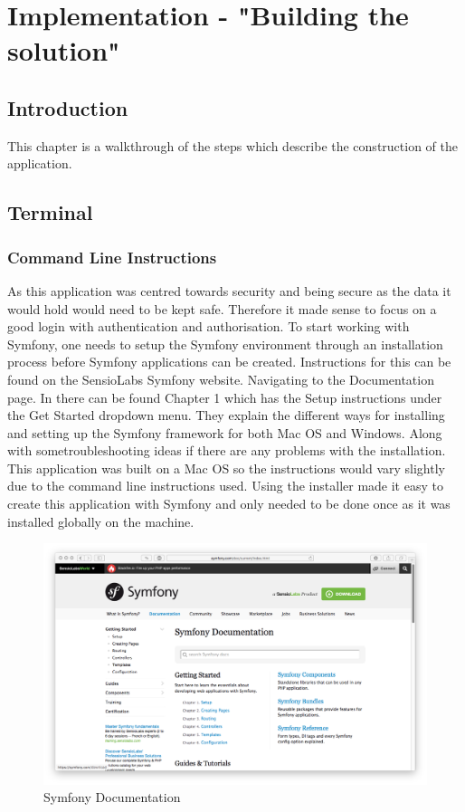 \chapter{Implementation - "Building the solution"}


\section{Introduction}

This chapter is a walkthrough of the steps which describe the construction of the application.

\section{Terminal}

\subsection{Command Line Instructions}

As this application was centred towards security and being secure as the data it would hold would need to be kept safe. Therefore it made sense to focus on a good login with authentication and authorisation. To start working with Symfony, one needs to setup the Symfony environment through an installation process before Symfony applications can be created. Instructions for this can be found on the SensioLabs Symfony website. Navigating to the Documentation page. In there can be found Chapter 1 which has the Setup instructions under the Get Started dropdown menu. They explain the different ways for installing and setting up the Symfony framework for both Mac OS and Windows. Along with some\newline troubleshooting ideas if there are any problems with the installation. This application was built on a Mac OS so the instructions would vary slightly due to the command line instructions used. Using the installer made it easy to create this application with Symfony and only needed to be done once as it was installed globally on the machine.

\begin{figure}[htbp]
   \centering
   \includegraphics[width=400pt]{figures/symfony_documentation.png} %
   \caption{Symfony Documentation}
   \label{fig:Symfony Documentation}
\end{figure}

